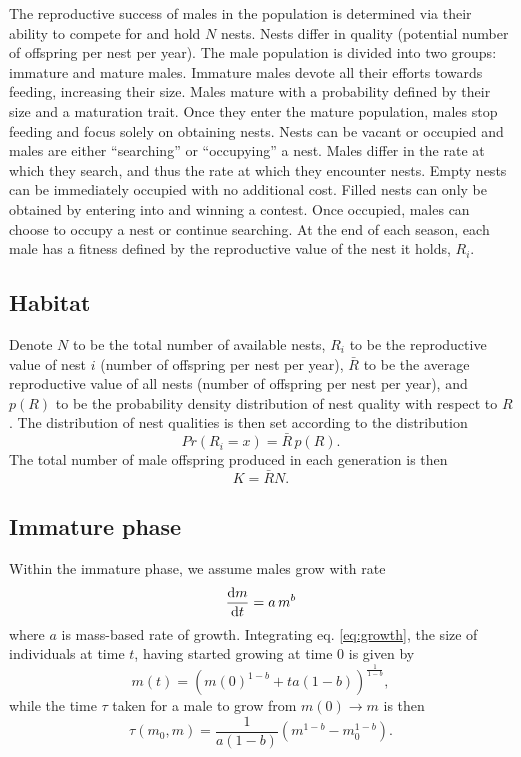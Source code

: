 \documentclass[a4paper,11pt]{article}
\begin{document}
The reproductive success of males in the population is determined via their ability to compete for and hold $N$ nests. Nests differ in quality (potential number of offspring per nest per year). The male population is divided into two groups: immature and mature males. Immature males devote all their efforts towards feeding, increasing their size. Males mature with a probability defined by their size and a maturation trait. Once they enter the mature population, males stop feeding and focus solely on obtaining nests. Nests can be vacant or occupied and males are either ``searching'' or ``occupying'' a nest. Males differ in the rate at which they search, and thus the rate at which they encounter nests. Empty nests can be immediately occupied with no additional cost. Filled nests can only be obtained by entering into and winning a contest. Once occupied, males can choose to occupy a nest or continue searching. At the end of each season, each male has a fitness defined by the reproductive value of the nest it holds, $R_i$.

\subsection{Habitat}

Denote $N$ to be the total number of available nests, $R_i$ to be the reproductive value of nest $i$ (number of offspring per nest per year), $\bar{R}$ to be the average reproductive value of all nests (number of offspring per nest per year), and $p(R)$ to be the probability density distribution of nest quality with respect to $R$. The distribution of nest qualities is then set according to the distribution
\begin{equation} \label{eq:pdf_R}
    Pr(R_i = x) =\bar{R} \, p(R).
\end{equation}
The total number of male offspring produced in each generation is then
\begin{equation} \label{eq:pdf_R}
    K = \bar{R} N.
\end{equation}

\subsection{Immature phase}

Within the immature phase, we assume males grow with rate
\begin{equation} \label{eq:growth}
\frac{{\rm d} m}{{\rm d} t} = a \, m^ b
\end{equation}
where $a$ is mass-based rate of growth. Integrating eq. \ref{eq:growth}, the size of individuals at time $t$, having started growing at time $0$ is given by
\begin{equation} \label{eq:growth}
m(t) = \left(m(0)^{1-b} + t a(1-b)\right)^{\frac1{1-b}},
\end{equation}
while the time $\tau$ taken for a male to grow from $m(0) \rightarrow m$ is then
\begin{equation} \label{eq:tau}
\tau(m_0, m) = \frac1{a(1-b)}\left(m ^{1-b} - m_0 ^{1-b}\right).
\end{equation}
\end{document}

